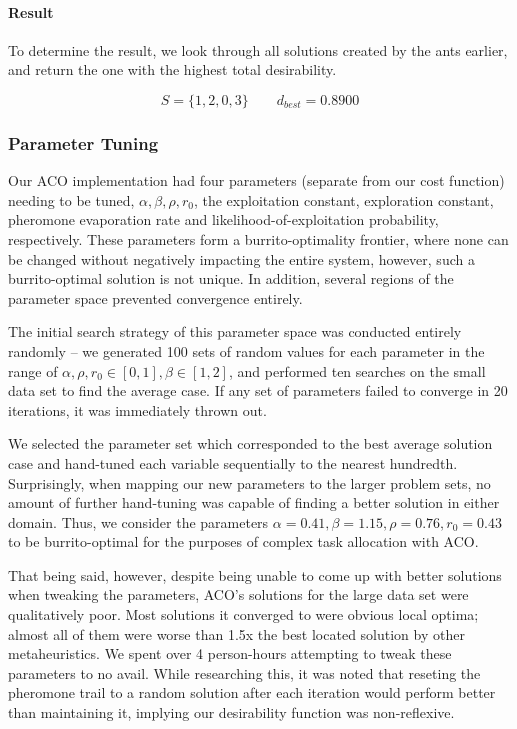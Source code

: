 \documentclass[a4paper]{article}
\newcommand{\subsubsubsection}[1]{\paragraph{#1} \mbox{}}
\begin{document}
\subsubsubsection{Result}

To determine the result, we look through all solutions created by the ants earlier, and return the one with the highest total desirability.

$$
S = \{1, 2, 0, 3\} \qquad d_{best} = 0.8900
$$


\subsubsection{Parameter Tuning}

Our ACO implementation had four parameters (separate from our cost function) needing to be tuned, $\alpha, \beta, \rho, r_0$, the exploitation constant, exploration constant, pheromone evaporation rate and likelihood-of-exploitation probability, respectively. These parameters form a burrito-optimality frontier, where none can be changed without negatively impacting the entire system, however, such a burrito-optimal solution is not unique. In addition, several regions of the parameter space prevented convergence entirely.

The initial search strategy of this parameter space was conducted entirely randomly -- we generated 100 sets of random values for each parameter in the range of $\alpha, \rho, r_0 \in [0, 1], \beta \in [1, 2]$, and performed ten searches on the small data set to find the average case. If any set of parameters failed to converge in 20 iterations, it was immediately thrown out.

We selected the parameter set which corresponded to the best average solution case and hand-tuned each variable sequentially to the nearest hundredth. Surprisingly, when mapping our new parameters to the larger problem sets, no amount of further hand-tuning was capable of finding a better solution in either domain. Thus, we consider the parameters $\alpha = 0.41, \beta = 1.15, \rho = 0.76, r_0 = 0.43$ to be burrito-optimal for the purposes of complex task allocation with ACO.

That being said, however, despite being unable to come up with better solutions when tweaking the parameters, ACO's solutions for the large data set were qualitatively poor. Most solutions it converged to were obvious local optima; almost all of them were worse than 1.5x the best located solution by other metaheuristics. We spent over 4 person-hours attempting to tweak these parameters to no avail. While researching this, it was noted that reseting the pheromone trail to a random solution after each iteration would perform better than maintaining it, implying our desirability function was non-reflexive.
\end{document}
